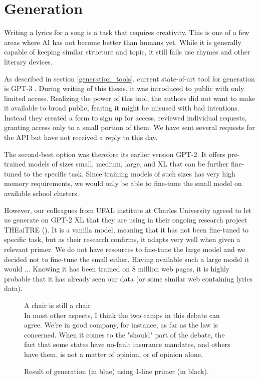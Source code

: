 \chapter{Generation}
Writing a lyrics for a song is a task that requires creativity. This is one of a few areas where AI has not become better than humans yet. While it is generally capable of keeping similar structure and topic, it still fails use rhymes and other literary devices.

As described in section \ref{generation_tools}, current state-of-art tool for generation is GPT-3 \cite{brown2020language}. During writing of this thesis, it was introduced to public with only limited access. Realizing the power of this tool, the authors did not want to make it available to broad public, fearing it might be misused with bad intentions. Instead they created a form to sign up for access, reviewed individual requests, granting access only to a small portion of them. We have sent several requests for the API but have not received a reply to this day.

The second-best option was therefore its earlier version GPT-2. It offers pre-trained models of sizes small, medium, large, and XL that can be further fine-tuned to the specific task. Since training models of such sizes has very high memory requirements, we would only be able to fine-tune the small model on available school clusters. 

However, our colleagues from UFAL institute at Charles University agreed to let us generate on GPT-2 XL that they are using in their ongoing research project THEaiTRE (\cite{rosa2021theaitre}). It is a vanilla model, meaning that it has not been fine-tuned to specific task, but as their research confirms, it adapts very well when given a relevant primer. We do not have resources to fine-tune the large model and we decided not to fine-tune the small either. Having available such a large model it would ...  Knowing it has been trained on 8 million web pages, it is highly probable that it has already seen our data (or some similar web containing lyrics data). 


\begin{figure}[htb]\centering
	A chair is still a chair \\
	\color{blue}In most other aspects, I think the two camps in this debate can agree. We're in good company, for instance, as far as the law is concerned. When it comes to the "should" part of the debate, the fact that some states have no-fault insurance mandates, and others have them, is not a matter of opinion, or of opinion alone. \\
	\endminipage\hfill
	\caption{Result of generation (in blue) using 1-line primer (in black).} \label{fig_1line_primer}
\end{figure} 





